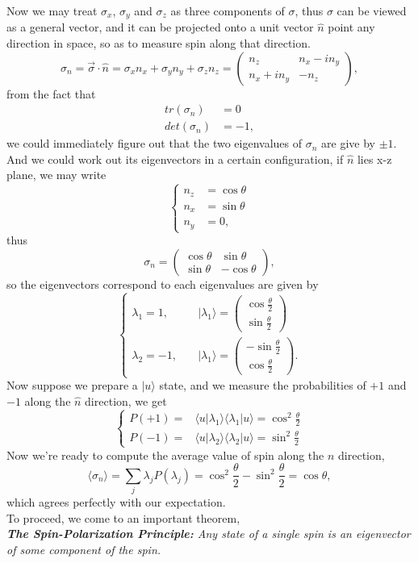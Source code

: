 \documentclass{article}
\newcommand{\be}{\begin{equation}}
\newcommand{\ee}{\end{equation}}
\newcommand{\ba}{\begin{array}}
\newcommand{\ea}{\end{array}}
\newcommand{\bs}{\be\begin{split}}
\newcommand{\1}{\left}
\newcommand{\2}{\right}
\newcommand{\la}{\langle}
\newcommand{\ra}{\rangle}
\newcommand{\n}{\nu}
\newcommand{\lam}{\lambda}
\newcommand{\sig}{\sigma}
\begin{document}
Now we may treat $\sig_x$, $\sig_y$ and $\sig_z$ as three components of $\sig$, thus $\sig$ can be viewed as a general vector, and it can be projected onto a unit vector $\hat n$ point any direction in space, so as to measure spin along that direction.
\be
\sig_n=\vec\sig\cdot\hat n=\sig_xn_x+\sig_yn_y+\sig_zn_z=\1(\ba{cc}n_z&n_x-in_y\\n_x+in_y&-n_z\ea\2),
\ee
from the fact that
\bs
tr(\sig_n)&=0\\
det(\sig_n)&=-1,
\end{split}\ee
we could immediately figure out that the two eigenvalues of $\sig_n$ are give by $\pm 1$. And we could work out its eigenvectors in a certain configuration, if $\hat n$ lies x-z plane, we may write
\be\1\{\begin{split}
n_z&=\cos\theta\\
n_x&=\sin\theta\\
n_y&=0,
\end{split}\2.\ee
thus 
\be
\sig_n=\1(\ba{cc}\cos\theta&\sin\theta\\\sin\theta&-\cos\theta\ea\2),
\ee
so the eigenvectors correspond to each eigenvalues are given by
\be\1\{\begin{split}
\lam_1=1, &\quad|\lam_1\ra=\1(\ba{c}\cos{\frac\theta 2}\\\sin{\frac\theta 2}\ea\2)\\
\lam_2=-1, &\quad|\lam_1\ra=\1(\ba{c}-\sin{\frac\theta 2}\\\cos{\frac\theta 2}\ea\2).
\end{split}\2.\ee
Now suppose we prepare a $|u\ra$ state, and we measure the probabilities of $+1$ and $-1$ along the $\hat n$ direction, we get
\be\1\{\begin{split}
P(+1)=&\la u|\lam_1\ra\la\lam_1|u\ra=\cos^2{\frac{\theta}{2}}\\
P(-1)=&\la u|\lam_2\ra\la\lam_2|u\ra=\sin^2{\frac{\theta}{2}}
\end{split}\2.\ee
Now we're ready to compute the average value of spin along the $n$ direction,
\be
\la \sig_n\ra=\sum_j \lam_j P(\lam_j)=\cos^2{\frac{\theta}{2}}-\sin^2{\frac{\theta}{2}}=\cos{\theta},
\ee
which agrees perfectly with our expectation.\\

To proceed, we come to an important theorem,\\

\textit{\textbf{The Spin-Polarization Principle:} Any state of a single spin is an eigenvector of some component of the spin.}\\
\end{document}
